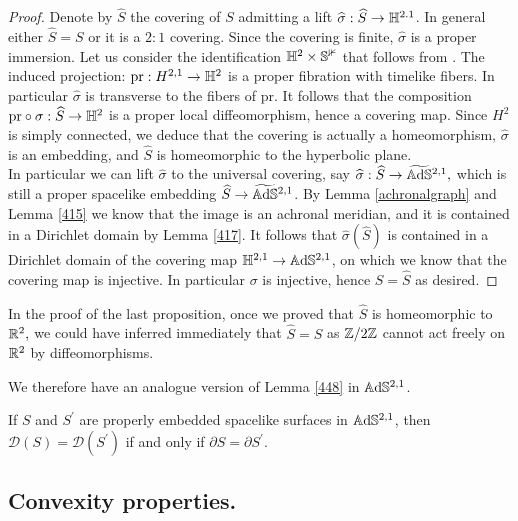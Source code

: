 \begin{proof}

    Denote by $\widehat{S}$ the covering of $S$ admitting a lift $\widehat{\sigma}:\widehat{S}\to\mathbb{H}^{2.1}$. In general either $\widehat{S}=S$ or it is a $2:1$ covering. Since the covering is finite, $\widehat{\sigma}$ is a proper immersion. Let us consider the identification $\mathbb{H}^2\times\mathbb{S^1}$ that follows from . The induced projection: $\text{pr}:H^{2,1}\to\mathbb{H}^2$ is a proper fibration with timelike fibers. In particular $\widehat{\sigma}$ is transverse to the fibers of $\text{pr}.$ It follows that the composition $\text{pr}\circ\sigma:\widehat{S}\to\mathbb{H}^2$ is a proper local diffeomorphism, hence a covering map. Since $H^2$ is simply connected, we deduce that the covering is actually a homeomorphism, $\widehat{\sigma}$ is an embedding, and $\widehat{S}$ is homeomorphic to the hyperbolic plane. \\
    In particular we can lift $\widehat{\sigma}$ to the universal covering, say $\widehat{\sigma}:\widehat{S}\to\widetilde{\mathbb{A}\mathrm{d}\mathbb{S}}{}^{2,1},$ which is still a proper spacelike embedding $\widehat{S}\to \widetilde{\mathbb{A}\mathrm{d}\mathbb{S}}{}^{2,1}$. By Lemma \ref{achronalgraph} and Lemma \ref{415} we know that the image is an achronal meridian, and it is contained in a Dirichlet domain by Lemma \ref{417}. It follows that $\widehat{\sigma}(\widehat{S})$ is contained in a Dirichlet domain of the covering map $\mathbb{H}^{2,1}\to\mathbb{A}\mathrm{d}\mathbb{S}^{2,1}$, on which we know that the covering map is injective. In particular $\sigma$ is injective, hence $S=\widehat{S}$ as desired.  
\end{proof}

\begin{observation}
    In the proof of the last proposition, once we proved that $\hat{S}$ is homeomorphic to $\mathbb{R}^2,$ we could have inferred immediately that $\hat{S}=S$ as $\mathbb{Z}/2\mathbb{Z}$ cannot act freely on $\mathbb{R}^2$ by diffeomorphisms. 
\end{observation}

We therefore have an analogue version of Lemma \ref{448} in $\mathbb{A}\mathrm{d}\mathbb{S}^{2,1}$.

\begin{corollary}
    If $S$ and $S^{\prime}$ are properly embedded spacelike surfaces in $\mathbb{A}\mathrm{d}\mathbb{S}^{2,1}$, then $\mathcal{D}(S)=\mathcal{D}(S^{\prime})$ if and only if $\partial S=\partial S^{\prime}$. 
\end{corollary}

\subsection{Convexity properties.}

